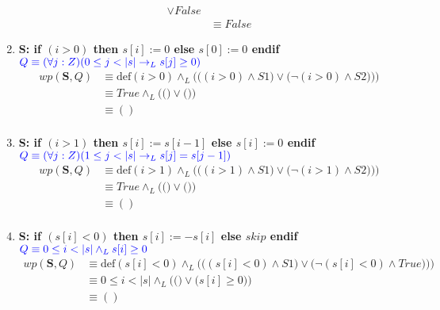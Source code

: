 \documentclass{article}
\begin{document}
\begin{enumerate}[label=\alph*)]
\begin{align*}
   								\vee False\\
   							&\equiv False
   		\end{align*}
	\item
		\textbf{S: if $(i>0)$ then $s[i] := 0$ else $s[0] := 0$ endif}\\
   		\hspace*{24mm}$\color{blue}Q \equiv (\forall j :Z)(0 \leq j < |s| 
   			\rightarrow_L s[j] \geq 0)$\\
   		\begin{align*}
   			wp(\textbf{S},Q)&\equiv \textrm{def}(i>0)\wedge_L 
   				\Bigg(\Big((i>0)\wedge S1\Big) \vee\Big(\neg (i>0)\wedge S2)\Big)\Bigg)\\
   							&\equiv True \wedge_L \Bigg(\Big(\Big) \vee \Big(\Big)\Bigg)\\
   							&\equiv () \\
   		\end{align*}
	\item
		\textbf{S: if $(i>1)$ then $s[i] := s[i-1]$ else $s[i] := 0$ endif}\\
   		\hspace*{24mm}$\color{blue}Q \equiv (\forall j :Z)(1 \leq j < |s| 
   			\rightarrow_L s[j] = s[j - 1])$\\
   		\begin{align*}
   			wp(\textbf{S},Q)&\equiv \textrm{def}(i>1)\wedge_L 
   				\Bigg(\Big((i>1)\wedge S1\Big) \vee\Big(\neg (i>1)\wedge S2)\Big)\Bigg)\\
   							&\equiv True \wedge_L\Bigg(\Big(\Big) \vee \Big(\Big)\Bigg)\\
   							&\equiv () \\
   		\end{align*}
	\item
		\textbf{S: if $(s[i]<0)$ then $s[i] := -s[i]$ else $skip$ endif}\\
   		\hspace*{24mm}$\color{blue}Q \equiv 0 \leq i < |s| \wedge_L s[i] \geq 0$\\
   		\begin{align*}
   			wp(\textbf{S},Q)&\equiv \textrm{def}(s[i]<0)\wedge_L 
   				\Bigg(\Big((s[i]<0)\wedge S1\Big) \vee\Big(\neg (s[i]<0)\wedge True)\Big)\Bigg)\\
   							&\equiv 0\leq i<|s|\wedge_L\Bigg(\Big(\Big) \vee \Big(s[i]\geq 0
   							\Big)\Bigg)\\
   							&\equiv () \\
   		\end{align*}

\end{enumerate}
\end{document}
